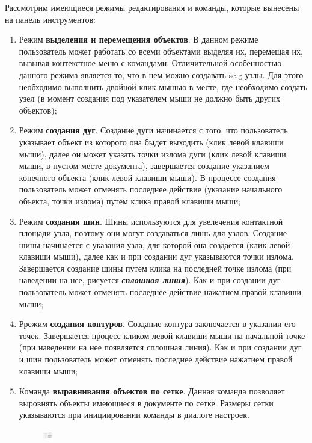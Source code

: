 Рассмотрим имеющиеся режимы редактирования и команды, которые вынесены на панель инструментов:
\begin{enumerate}
	\item Режим \textbf{выделения и перемещения объектов}. В данном режиме пользователь может работать со всеми объектами выделяя их, перемещая их, вызывая контекстное меню с командами. 
Отличительной особенностью данного режима является то, что в нем можно создавать {\sf sc.g-узлы}. Для этого необходимо выполнить двойной клик мышью в месте, где необходимо создать узел (в момент создания под указателем мыши не должно быть других объектов);
	\item Режим \textbf{создания дуг}. Создание дуги начинается с того, что пользователь указывает объект из которого она быдет выходить (клик левой клавиши мыши), далее он может указать точки излома дуги (клик левой клавиши мыши, в пустом месте документа), завершается создание указанием конечного объекта (клик левой клавиши мыши). В процессе создания пользователь может отменять последнее действие (указание начального объекта, точки излома) путем клика правой клавиши мыши;
	\item Режим \textbf{создания шин}. Шины используются для увелечения контактной площади узла, поэтому они могут создаваться лишь для узлов. Создание шины начинается с указания узла, для которой она создается (клик левой клавиши мыши), далее как и при создании дуг указываются точки излома. Завершается создание шины путем клика на последней точке излома (при наведении на нее, рисуется {\bf\it сплошная линия}). Как и при создании дуг пользователь может отменять последнее действие нажатием правой клавиши мыши;
	\item Ррежим \textbf{создания контуров}. Создание контура заключается в указании его точек. Завершается процесс кликом левой клавиши мыши на начальной точке (при наведении на нее появляется сплошная линия).  Как и при создании дуг и шин пользователь может отменять последнее действие нажатием правой клавиши мыши;
	\item Команда \textbf{выравнивания объектов по сетке}. Данная команда позволяет выровнять объекты имеющиеся в документе по сетке. Размеры сетки указываются при инициировании команды в диалоге настроек.
\begin{figure}[h]
	\centering\includegraphics[height=10.98, height=5.75cm]{../images/gridaligment.png}

\end{figure}
\end{enumerate}
